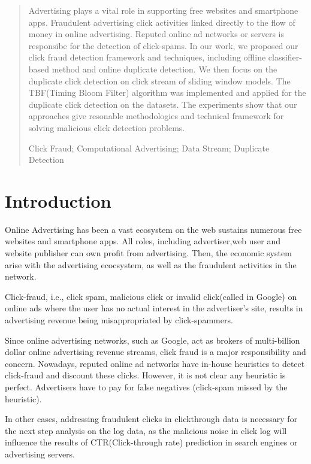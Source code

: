 \documentclass[runningheads,report]{llncs}
\newcommand{\keywords}[1]{\par\addvspace\baselineskip
\noindent\keywordname\enspace\ignorespaces#1}
\begin{document}
\begin{abstract}
Advertising plays a vital role in supporting free websites and smartphone apps. Fraudulent advertising click activities linked directly to the flow of money in online advertising. Reputed online ad networks or servers is responsibe for the detection of click-spams. In our work, we proposed our click fraud detection framework and techniques, including offline classifier-based method and online duplicate detection. We then focus on the duplicate click detection on click stream of sliding window models. The TBF(Timing Bloom Filter) algorithm was implemented and applied for the duplicate click detection on the datasets. The experiments show that our approaches give resonable methodologies and technical framework for solving malicious click detection problems. 
\keywords{Click Fraud; Computational Advertising; Data Stream; Duplicate Detection}
\end{abstract}

\section{Introduction}

Online Advertising has been a vast ecosystem on the web sustains numerous free websites and 
smartphone apps. All roles, including advertiser,web user and website publisher can own  profit from advertising. Then, the economic system  arise with the advertising ecocsystem, as well as the fraudulent activities in the network.

Click-fraud, i.e., click spam, malicious click or invalid click(called in Google) on online ads where the user has no actual interest in the advertiser's site, results in advertising revenue being misappropriated by click-spammers\cite{DBLP:conf/sigcomm/DaveGZ12}.

Since online advertising networks, such as Google, act as brokers of multi-billion dollar online advertising revenue streams, click fraud is a major responsibility and concern\cite{kintana2009goals}. Nowadays, reputed online ad networks have in-house heuristics to detect click-fraud and discount these clicks\cite{website:GoogleReport}. However, it is not clear any heuristic is perfect. Advertisers have to pay for false negatives (click-spam missed by the heuristic).

In other cases, addressing fraudulent clicks in clickthrough data is necessary for the next step analysis on the log data, as the malicious noise in click log will influence the results of CTR(Click-through rate) prediction in search engines or advertising servers.
\end{document}
